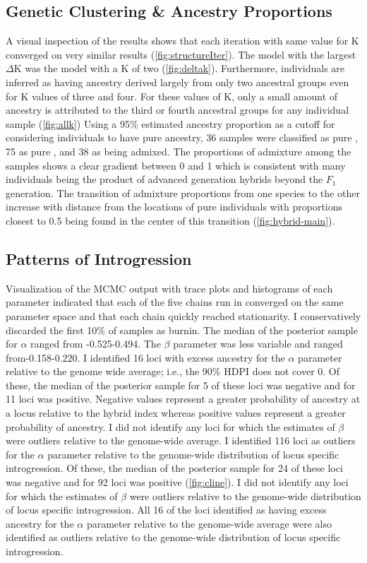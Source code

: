 \subsection{Genetic Clustering \& Ancestry Proportions}
A visual inspection of the \structure results shows that each iteration with  
same value for K converged on very similar results (\cref{fig:structureIter}). 
The \structure model with the largest $\Delta$K was the model with a K of two (\cref{fig:deltak}).
Furthermore, individuals are inferred as having ancestry derived largely 
from only two ancestral groups even for K values of three and four. For these values
of K, only a small amount of ancestry is attributed to the third or fourth 
ancestral groups for any individual sample (\cref{fig:allk})
Using a 95\% estimated ancestry proportion as a cutoff for considering individuals to have
pure ancestry, 36 samples were classified as pure \amer, 75 as pure \terr, and  
38 as being admixed. 
The proportions of admixture among the samples shows a clear gradient between 0 
and 1 which is consistent with many individuals being the product of advanced 
generation hybrids beyond the $F_1$ generation.
The transition of admixture proportions from one species to the other 
increase with distance from the locations of pure individuals with proportions 
closest to 0.5 being found in the center of this transition (\cref{fig:hybrid-main}).

\subsection{Patterns of Introgression}
Visualization of the MCMC output with trace plots and histograms of each parameter 
indicated that each of the five chains run in \bgc converged on the same parameter 
space and that each chain quickly reached stationarity. 
I conservatively discarded the first 10\% of samples as burnin. 
The median of the posterior sample for $\alpha$ ranged from -0.525-0.494. 
The $\beta$ parameter was less variable and ranged from-0.158-0.220. 
I identified 16 loci with excess ancestry for the $\alpha$ parameter relative to 
the genome wide average; i.e., the 90\% HDPI does not cover 0. 
Of these, the median of the posterior sample for 5 of these loci was negative   
and for 11 loci was positive. Negative values represent a greater probability 
of \amer ancestry at a locus relative to the hybrid index whereas positive values 
represent a greater probability of \terr ancestry.
I did not identify any loci for which the estimates of $\beta$ were outliers
relative to the genome-wide average. 
I identified 116 loci as outliers for the $\alpha$ parameter relative to the
genome-wide distribution of locus specific introgression. 
Of these, the median of the posterior sample for 24 of these loci was negative
and for 92 loci was positive (\cref{fig:cline}).
I did not identify any loci for which the estimates of $\beta$ were outliers
relative to the genome-wide distribution of locus specific introgression. 
All 16 of the loci identified as having excess ancestry for the $\alpha$ parameter relative to 
the genome-wide average were also identified as outliers relative to the  
genome-wide distribution of locus specific introgression.

